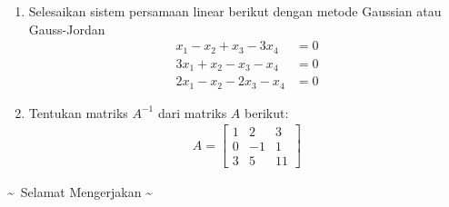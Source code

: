 \documentclass[12pt]{article}
\begin{document}
\begin{enumerate}
\item Selesaikan sistem persamaan linear berikut dengan metode Gaussian atau Gauss-Jordan
\begin{align*}
x_1 - x_2 + x_3 - 3x_4 &= 0 \\
3x_1 + x_2 - x_3 - x_4 &= 0 \\
2x_1 - x_2 - 2x_3 - x_4 &= 0
\end{align*}

\item Tentukan matriks $A^{-1}$ dari matriks $A$ berikut:
\begin{align*}
A = \begin{bmatrix} 1 & 2 & 3 \\ 0 & -1 & 1 \\ 3 & 5 & 11 \end{bmatrix}
\end{align*}

\end{enumerate}

\vspace{1cm}
\begin{center}
    \textasciitilde\ Selamat Mengerjakan \textasciitilde
\end{center}
\end{document}
